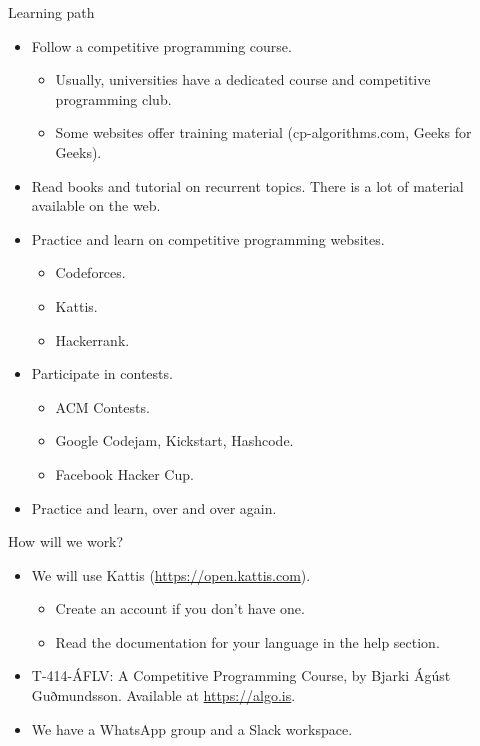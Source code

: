 \documentclass{beamer}
\begin{document}
\begin{frame}{Learning path}
\begin{itemize}
  \justifying
  \item Follow a competitive programming course.
  \begin{itemize}
    \justifying
    \item Usually, universities have a dedicated course and competitive programming club.
    \item Some websites offer training material (cp-algorithms.com, Geeks for Geeks).
  \end{itemize}
  \item Read books and tutorial on recurrent topics. There is a lot of material available on the web.
  \item Practice and learn on competitive programming websites.
  \begin{itemize}
    \justifying
    \item Codeforces.
    \item Kattis.
    \item Hackerrank.
  \end{itemize}
  \item Participate in contests.
  \begin{itemize}
    \justifying
    \item ACM Contests.
    \item Google Codejam, Kickstart, Hashcode.
    \item Facebook Hacker Cup.
  \end{itemize}
  \item Practice and learn, over and over again.
\end{itemize}
\end{frame}

\begin{frame}{How will we work?}
\begin{itemize}
  \justifying
  \item We will use Kattis (\url{https://open.kattis.com}).
  \begin{itemize}
    \justifying
    \item Create an account if you don't have one.
    \item Read the documentation for your language in the help section.
  \end{itemize}
  \item T-414-ÁFLV: A Competitive Programming Course, by Bjarki Ágúst Guðmundsson. Available at \url{https://algo.is}.
  \item We have a WhatsApp group and a Slack workspace.
\end{itemize}
\end{frame}
\end{document}
